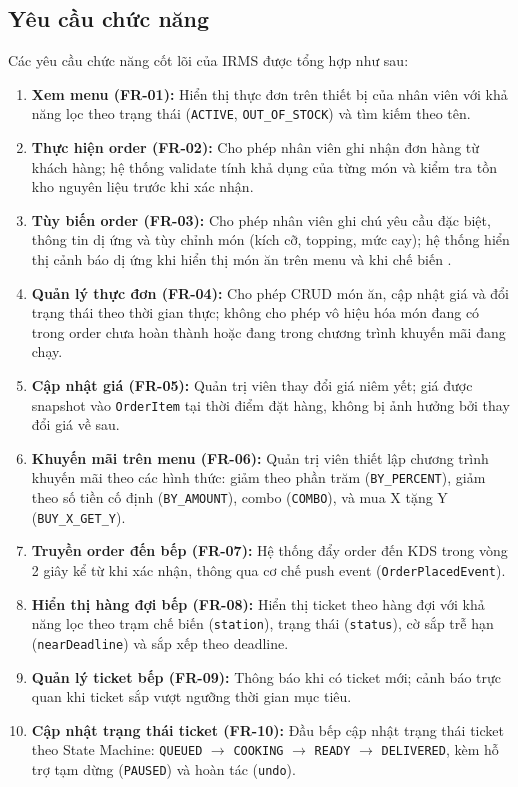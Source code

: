 \subsection{Yêu cầu chức năng}
 
Các yêu cầu chức năng cốt lõi của IRMS được tổng hợp như sau:
 
\begin{enumerate}
  \item \textbf{Xem menu (FR-01):} Hiển thị thực đơn trên thiết bị của nhân viên với khả năng lọc theo trạng thái (\texttt{ACTIVE}, \texttt{OUT\_OF\_STOCK}) và tìm kiếm theo tên.
  \item \textbf{Thực hiện order (FR-02):} Cho phép nhân viên ghi nhận đơn hàng từ khách hàng; hệ thống validate tính khả dụng của từng món và kiểm tra tồn kho nguyên liệu trước khi xác nhận.
  \item \textbf{Tùy biến order (FR-03):} Cho phép nhân viên ghi chú yêu cầu đặc biệt, thông tin dị ứng và tùy chỉnh món (kích cỡ, topping, mức cay); hệ thống hiển thị cảnh báo dị ứng khi hiển thị món ăn trên menu và khi chế biến .
  \item \textbf{Quản lý thực đơn (FR-04):} Cho phép CRUD món ăn, cập nhật giá và đổi trạng thái theo thời gian thực; không cho phép vô hiệu hóa món đang có trong order chưa hoàn thành hoặc đang trong chương trình khuyến mãi đang chạy.
  \item \textbf{Cập nhật giá (FR-05):} Quản trị viên thay đổi giá niêm yết; giá được snapshot vào \texttt{OrderItem} tại thời điểm đặt hàng, không bị ảnh hưởng bởi thay đổi giá về sau.
  \item \textbf{Khuyến mãi trên menu (FR-06):} Quản trị viên thiết lập chương trình khuyến mãi theo các hình thức: giảm theo phần trăm (\texttt{BY\_PERCENT}), giảm theo số tiền cố định (\texttt{BY\_AMOUNT}), combo (\texttt{COMBO}), và mua X tặng Y (\texttt{BUY\_X\_GET\_Y}).
  \item \textbf{Truyền order đến bếp (FR-07):} Hệ thống đẩy order đến KDS trong vòng 2 giây kể từ khi xác nhận, thông qua cơ chế push event (\texttt{OrderPlacedEvent}).
  \item \textbf{Hiển thị hàng đợi bếp (FR-08):} Hiển thị ticket theo hàng đợi với khả năng lọc theo trạm chế biến (\texttt{station}), trạng thái (\texttt{status}), cờ sắp trễ hạn (\texttt{nearDeadline}) và sắp xếp theo deadline.
  \item \textbf{Quản lý ticket bếp (FR-09):} Thông báo khi có ticket mới; cảnh báo trực quan khi ticket sắp vượt ngưỡng thời gian mục tiêu.
  \item \textbf{Cập nhật trạng thái ticket (FR-10):} Đầu bếp cập nhật trạng thái ticket theo State Machine: \texttt{QUEUED} $\rightarrow$ \texttt{COOKING} $\rightarrow$ \texttt{READY} $\rightarrow$ \texttt{DELIVERED}, kèm hỗ trợ tạm dừng (\texttt{PAUSED}) và hoàn tác (\texttt{undo}).

\end{enumerate}
